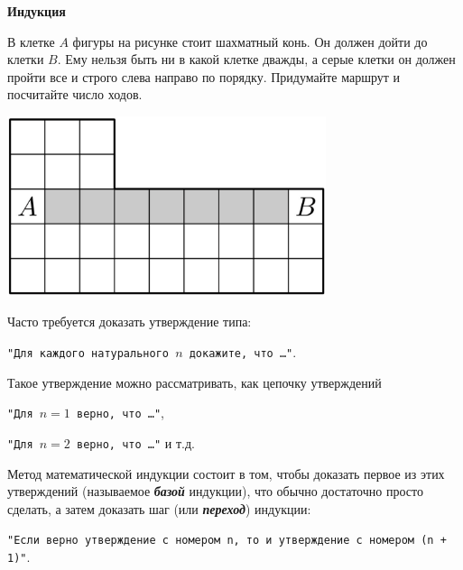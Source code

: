 \documentclass{article}
\begin{document}
\large


\begin{center}
\textbf{Индукция}
\end{center}

\begin{enumerate}[label*=\protect\fbox{\arabic{enumi}}]
	
	\setcounter{enumi}{-3}
\begin{minipage}{0.5\linewidth}
	\item В клетке $A$ фигуры на рисунке стоит шахматный конь. Он должен дойти до клетки $B$. Ему нельзя быть ни в какой клетке дважды, а серые клетки он должен пройти все и строго слева направо по порядку. Придумайте маршрут и посчитайте число ходов.
\end{minipage}
\begin{minipage}{0.5\linewidth}
	\center\includegraphics[width=0.7\textwidth]{img1.png}
\end{minipage}
\end{enumerate}


Часто требуется доказать утверждение типа:

\begin{center}
	\texttt{"Для каждого натурального $n$ докажите, что \dots"}.
\end{center}

Такое утверждение можно рассматривать, как цепочку утверждений 

\begin{center}
	\texttt{"Для $n = 1$ верно, что \dots"},
\end{center} 
\begin{center} 
	\texttt{"Для $n = 2$ верно, что \dots"} и т.д.
\end{center} 


Метод математической индукции состоит в том, чтобы доказать первое из этих утверждений (называемое \textbf{\textit{базой}} индукции), что обычно достаточно просто сделать, а затем доказать шаг (или \textbf{\textit{переход}}) индукции:
\begin{center} 
	\texttt{"Если верно утверждение с номером n, то и утверждение с номером (n + 1)"}.
\end{center} 
\end{document}
